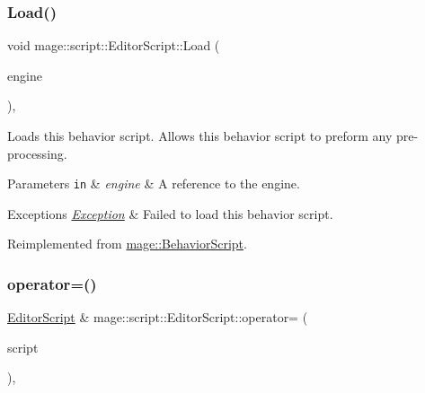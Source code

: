 \subsubsection{\texorpdfstring{Load()}{Load()}}
{\footnotesize\ttfamily void mage\+::script\+::\+Editor\+Script\+::\+Load (\begin{DoxyParamCaption}\item[{\mbox{[}\mbox{[}maybe\+\_\+unused\mbox{]} \mbox{]} \hyperlink{classmage_1_1_engine}{Engine} \&}]{engine }\end{DoxyParamCaption})\hspace{0.3cm}{\ttfamily [override]}, {\ttfamily [virtual]}}

Loads this behavior script. Allows this behavior script to preform any pre-\/processing.


\begin{DoxyParams}[1]{Parameters}
\mbox{\tt in}  & {\em engine} & A reference to the engine. \\
\hline
\end{DoxyParams}

\begin{DoxyExceptions}{Exceptions}
{\em \hyperlink{classmage_1_1_exception}{Exception}} & Failed to load this behavior script. \\
\hline
\end{DoxyExceptions}


Reimplemented from \hyperlink{classmage_1_1_behavior_script_ae7864876b2ffb1d1d8d8a56e3099f1f2}{mage\+::\+Behavior\+Script}.

\hypertarget{classmage_1_1script_1_1_editor_script_ab7b4dda8389d07d41eba1474491b4a36}{}\label{classmage_1_1script_1_1_editor_script_ab7b4dda8389d07d41eba1474491b4a36} 
\subsubsection{\texorpdfstring{operator=()}{operator=()}\hspace{0.1cm}{\footnotesize\ttfamily [1/2]}}
{\footnotesize\ttfamily \hyperlink{classmage_1_1script_1_1_editor_script}{Editor\+Script} \& mage\+::script\+::\+Editor\+Script\+::operator= (\begin{DoxyParamCaption}\item[{const \hyperlink{classmage_1_1script_1_1_editor_script}{Editor\+Script} \&}]{script }\end{DoxyParamCaption})\hspace{0.3cm}{\ttfamily [default]}, {\ttfamily [noexcept]}}

